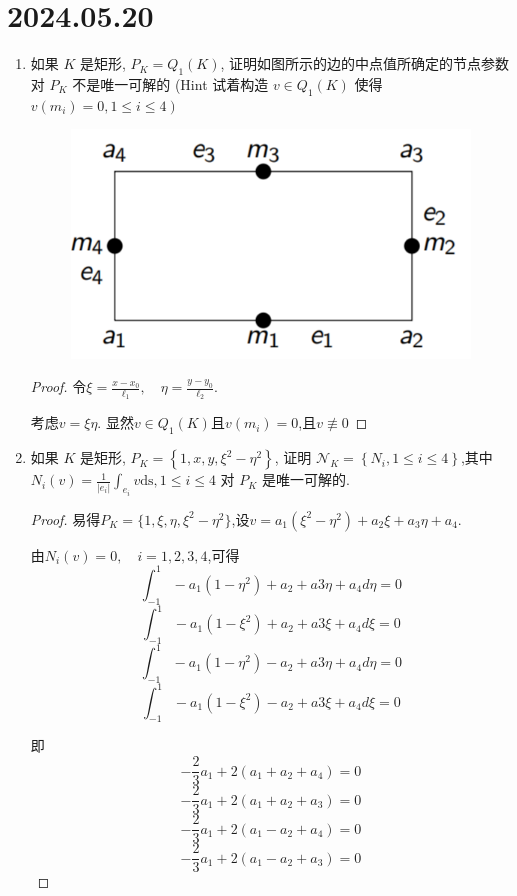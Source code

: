 \documentclass[12pt,a4paper]{article}
\begin{document}
	
	\noindent
	
	\section*{2024.05.20}	
	
	\begin{enumerate}
		\item 如果 $K$ 是矩形, $P_K=Q_1(K)$, 证明如图所示的边的中点值所确定的节点参数对 $P_K$ 不是唯一可解的 (Hint 试着构造 $v \in Q_1(K)$ 使得 $\left.v\left(m_i\right)=0,1 \leq i \leq 4\right)$
		\begin{figure}[h]
			\centering
			\includegraphics[width=0.7\linewidth]{rec}
			\label{fig:rec}
		\end{figure}
		
		\begin{proof}
			令$\xi=\frac{x-x_0}{\ell_1},\quad\eta=\frac{y-y_0}{\ell_2}.$
			
			考虑$v = \xi \eta$. 显然$v \in Q_1(K)$且$v(m_i)=0$,且$v \not\equiv 0$
		\end{proof}
		
		\item 如果 $K$ 是矩形, $P_K=\left\{1, x, y, \xi^2-\eta^2\right\}$, 证明 $\mathcal{N}_K=\left\{N_i, 1 \leq i \leq 4\right\}$,其中 $N_i(v)=\frac{1}{\left|e_i\right|} \int_{e_i} v \mathrm{ds}, 1 \leq i \leq 4$ 对 $P_K$ 是唯一可解的.
		
		\begin{proof}
			易得$P_K=\{1,\xi,\eta,\xi^2-\eta^2\}$,设$v = a_1 (\xi^2 - \eta^2) + a_2 \xi +a_3 \eta +a_4$.
			
			由$N_i(v) = 0, \quad i = 1,2,3,4$,可得
			$$\int_{-1}^1 -a_1 (1-\eta^2) + a_2 + a3\eta + a_4 d\eta =0$$
			$$\int_{-1}^1 -a_1 (1-\xi^2) + a_2 + a3\xi + a_4 d\xi =0$$
			$$\int_{-1}^1 -a_1 (1-\eta^2) - a_2 + a3\eta + a_4 d\eta =0$$
			$$\int_{-1}^1 -a_1 (1-\xi^2) - a_2 + a3\xi + a_4 d\xi =0$$
			
			即
			$$-\frac{2}{3}a_1+2(a_1+a_2+a_4)=0$$
			$$-\frac{2}{3}a_1+2(a_1+a_2+a_3)=0$$
			$$-\frac{2}{3}a_1+2(a_1-a_2+a_4)=0$$
			$$-\frac{2}{3}a_1+2(a_1-a_2+a_3)=0$$
			

\end{proof}
\end{enumerate}
\end{document}
